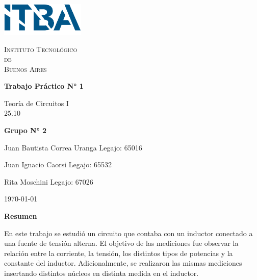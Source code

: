 \documentclass{article}
\newcommand{\Facultad}{Instituto Tecnológico \\de\\ Buenos Aires} %
\newcommand{\TPn}{Trabajo Práctico N° 1}
\begin{document}
    \begin{titlepage} %

        \begin{flushleft}
            \centering
            \includegraphics[width=0.3\textwidth]{Logo_ITBA.png}
        \end{flushleft}

        \centering
            
        {\scshape\LARGE \Facultad \par} %
        \vspace{1cm}                    %


        {\huge\bfseries \TPn \par}
        \vspace{1.5cm}
        {\Large Teoría de Circuitos I\\ 25.10 \par}
        \vfill                      %
        {\Large \bfseries Grupo N° 2 \par}
        \vspace{1cm}
        {\large Juan Bautista Correa Uranga \hfill Legajo: 65016 \par} %
        {\large Juan Ignacio Caorsi \hfill Legajo: 65532  \par}
        {\large Rita Moschini \hfill Legajo: 67026 \par} 
        \vfill
        {\large \today\par}
        \vfil

    \end{titlepage}


    {\centering \LARGE \bfseries Resumen \par}
    
    En este trabajo se estudió un circuito que contaba con un inductor conectado a una fuente de tensión alterna. El
    objetivo de las mediciones fue observar la relación entre la corriente, la tensión, los distintos tipos de potencias
    y la constante del inductor. Adicionalmente, se realizaron las mismas mediciones insertando distintos núcleos 
    en distinta medida en el inductor. \par
\end{document}
